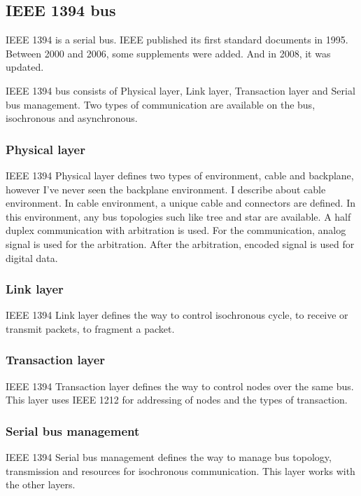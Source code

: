 \documentclass[onecolumn]{article}
\begin{document}
\subsection{IEEE 1394 bus}

IEEE 1394 is a serial bus. IEEE published its first standard documents in 1995\cite{ieee1394-1}. Between 2000 and 2006, some supplements were added\cite{ieee1394-1-a, ieee1394-1-b, ieee1394-1-c}. And in 2008, it was updated\cite{ieee1394-2}.

IEEE 1394 bus consists of Physical layer, Link layer, Transaction layer and Serial bus management. Two types of communication are available on the bus, isochronous and asynchronous.

\subsubsection{Physical layer}
IEEE 1394 Physical layer defines two types of environment, cable and backplane, however I've never seen the backplane environment. I describe about cable environment. In cable environment, a unique cable and connectors are defined. In this environment, any bus topologies such like tree and star are available. A half duplex communication with arbitration is used. For the communication, analog signal is used for the arbitration. After the arbitration, encoded signal is used for digital data.


\subsubsection{Link layer}
IEEE 1394 Link layer defines the way to control isochronous cycle, to receive or transmit packets, to fragment a packet.


\subsubsection{Transaction layer}
IEEE 1394 Transaction layer defines the way to control nodes over the same bus. This layer uses IEEE 1212 for addressing of nodes and the types of transaction.

\subsubsection{Serial bus management}
IEEE 1394 Serial bus management defines the way to manage bus topology, transmission and resources for isochronous communication. This layer works with the other layers.
\end{document}

